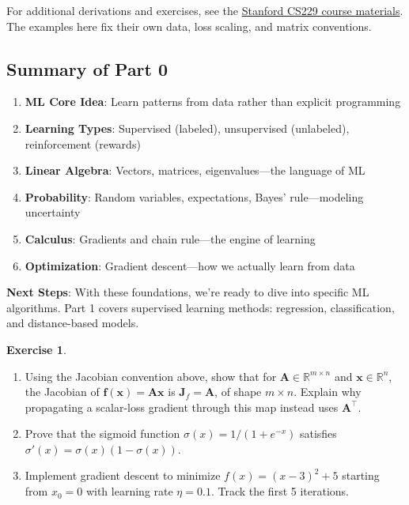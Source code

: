\documentclass[11pt,twoside]{article}
\numberwithin{equation}{section}
\newcommand{\R}{\mathbb{R}}
\newcommand{\vect}[1]{\bm{#1}}
\newcommand{\mat}[1]{\bm{#1}}
\theoremstyle{plain}
\theoremstyle{definition}
\newtheorem{exercise}[theorem]{Exercise}
\theoremstyle{remark}
\begin{document}
For additional derivations and exercises, see the \href{https://see.stanford.edu/Course/CS229}{Stanford CS229 course materials}. The examples here fix their own data, loss scaling, and matrix conventions.

\subsection{Summary of Part 0}

\begin{tcolorbox}[colback=yellow!10!white,colframe=orange!75!black,title=Key Takeaways]
\begin{enumerate}
\item \textbf{ML Core Idea}: Learn patterns from data rather than explicit programming
\item \textbf{Learning Types}: Supervised (labeled), unsupervised (unlabeled), reinforcement (rewards)
\item \textbf{Linear Algebra}: Vectors, matrices, eigenvalues---the language of ML
\item \textbf{Probability}: Random variables, expectations, Bayes' rule---modeling uncertainty
\item \textbf{Calculus}: Gradients and chain rule---the engine of learning
\item \textbf{Optimization}: Gradient descent---how we actually learn from data
\end{enumerate}

\textbf{Next Steps}: With these foundations, we're ready to dive into specific ML algorithms. Part 1 covers supervised learning methods: regression, classification, and distance-based models.
\end{tcolorbox}

\begin{exercise}
\begin{enumerate}
\item Using the Jacobian convention above, show that for $\mat{A}\in\R^{m\times n}$ and $\vect{x}\in\R^n$, the Jacobian of $\vect{f}(\vect{x})=\mat{A}\vect{x}$ is $\mat{J}_f=\mat{A}$, of shape $m\times n$. Explain why propagating a scalar-loss gradient through this map instead uses $\mat{A}^\top$.
\item Prove that the sigmoid function $\sigma(x) = 1/(1+e^{-x})$ satisfies $\sigma'(x) = \sigma(x)(1-\sigma(x))$.
\item Implement gradient descent to minimize $f(x) = (x-3)^2 + 5$ starting from $x_0 = 0$ with learning rate $\eta = 0.1$. Track the first 5 iterations.
\end{enumerate}
\end{exercise}
\end{document}
